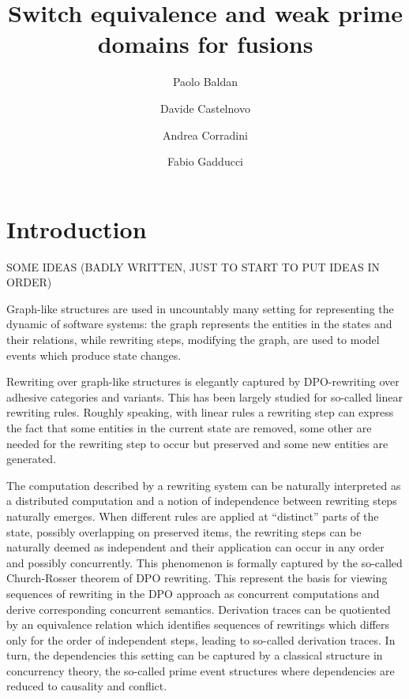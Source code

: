 \documentclass[a4paper]{article}
\title{Switch equivalence and weak prime domains for fusions}
\author{Paolo Baldan\and Davide Castelnovo\and  Andrea Corradini\and Fabio Gadducci}
\theoremstyle{definition}
\begin{document}
\maketitle



\begin{abstract}
\end{abstract}

\tableofcontents
\section{Introduction}


SOME IDEAS (BADLY WRITTEN, JUST TO START TO PUT IDEAS IN ORDER)

Graph-like structures are used in uncountably many setting for representing the dynamic of software systems: the graph represents the entities in the states and their relations, while rewriting steps, modifying the graph, are used to model events which produce state changes.

Rewriting over graph-like structures is elegantly captured by
DPO-rewriting over adhesive categories and variants.  This has been
largely studied for so-called linear rewriting rules. Roughly
speaking, with linear rules a rewriting step can express the fact that
some entities in the current state are removed, some other are needed
for the rewriting step to occur but preserved and some new entities
are generated.

The computation described by a rewriting system can be naturally
interpreted as a distributed computation and a notion of independence
between rewriting steps naturally emerges. When different rules are
applied at ``distinct'' parts of the state, possibly overlapping on
preserved items, the rewriting steps can be naturally deemed as
independent and their application can occur in any order and possibly
concurrently. This phenomenon is formally captured by the so-called
Church-Rosser theorem of DPO rewriting. This represent the basis for
viewing sequences of rewriting in the DPO approach as concurrent
computations and derive corresponding concurrent semantics. Derivation
traces can be quotiented by an equivalence relation which identifies
sequences of rewritings which differs only for the order of
independent steps, leading to so-called derivation traces. In turn,
the dependencies this setting can be captured by a classical structure
in concurrency theory, the so-called prime event structures where
dependencies are reduced to causality and conflict.
\end{document}

